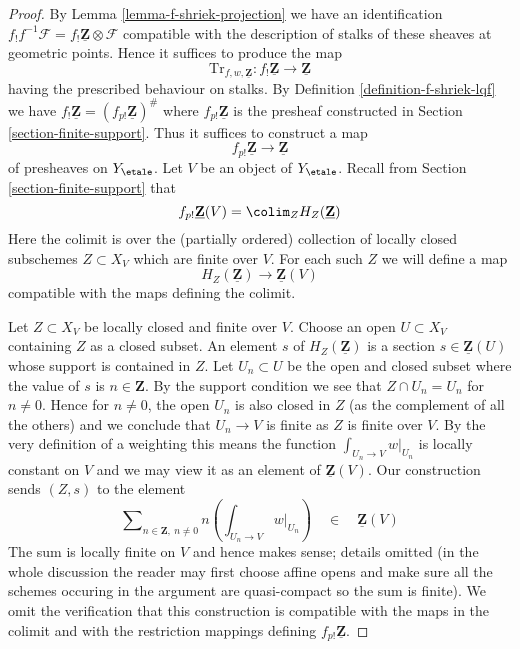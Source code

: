 \begin{proof}
By Lemma \ref{lemma-f-shriek-projection} we have an identification
$f_!f^{-1}\mathcal{F} = f_!\underline{\mathbf{Z}} \otimes \mathcal{F}$
compatible with the description of stalks of these sheaves at
geometric points. Hence it suffices to produce the map
$$
\text{Tr}_{f, w, \underline{\mathbf{Z}}} :
f_!\underline{\mathbf{Z}}
\longrightarrow
\underline{\mathbf{Z}}
$$
having the prescribed behaviour on stalks. By
Definition \ref{definition-f-shriek-lqf} we have
$f_!\underline{\mathbf{Z}} = (f_{p!}\underline{\mathbf{Z}})^\#$
where $f_{p!}\underline{\mathbf{Z}}$ is the presheaf
constructed in Section \ref{section-finite-support}.
Thus it suffices to construct a map
$$
f_{p!}\underline{\mathbf{Z}} \longrightarrow \underline{\mathbf{Z}}
$$
of presheaves on $Y_\etale$. Let $V$ be an object of $Y_\etale$.
Recall from Section \ref{section-finite-support} that
$$
f_{p!}\underline{\mathbf{Z}}(V) = \colim_Z H_Z(\underline{\mathbf{Z}})
$$
Here the colimit is over the (partially ordered) collection of locally closed
subschemes $Z \subset X_V$ which are finite over $V$. For each such
$Z$ we will define a map
$$
H_Z(\underline{\mathbf{Z}}) \longrightarrow \underline{\mathbf{Z}}(V)
$$
compatible with the maps defining the colimit.

\medskip\noindent
Let $Z \subset X_V$ be locally closed and finite over $V$.
Choose an open $U \subset X_V$ containing $Z$ as a closed subset.
An element $s$ of $H_Z(\underline{\mathbf{Z}})$ is a section
$s \in \underline{\mathbf{Z}}(U)$ whose support is contained in $Z$.
Let $U_n \subset U$ be the open and closed subset where the value
of $s$ is $n \in \mathbf{Z}$. By the support condition we see that
$Z \cap U_n = U_n$ for $n \not = 0$. Hence for $n \not = 0$, the open
$U_n$ is also closed in $Z$ (as the complement of all the others)
and we conclude that $U_n \to V$ is finite as $Z$ is finite over $V$.
By the very definition of a weighting this means the
function $\int_{U_n \to V} w|_{U_n}$ is locally constant on $V$
and we may view it as an element of $\underline{\mathbf{Z}}(V)$.
Our construction sends $(Z, s)$ to the element
$$
\sum\nolimits_{n \in \mathbf{Z},\ n \not = 0}
n \left(\int_{U_n \to V} w|_{U_n}\right)
\quad \in \quad \underline{\mathbf{Z}}(V)
$$
The sum is locally finite on $V$ and hence makes sense; details omitted
(in the whole discussion the reader may first choose affine opens and
make sure all the schemes occuring in the argument are quasi-compact so
the sum is finite). We omit the verification that this construction
is compatible with the maps in the colimit and with the restriction
mappings defining $f_{p!}\underline{\mathbf{Z}}$.


\end{proof}

